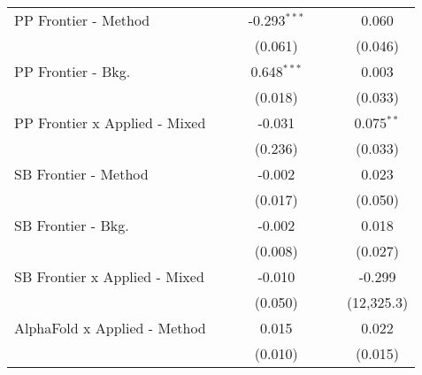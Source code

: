 \begin{tabular}{lcccccc}
   PP Frontier - Method                        &                &                & -0.293$^{***}$ &                &               & 0.060\\   
                                               &                &                & (0.061)        &                &               & (0.046)\\   
   PP Frontier - Bkg.                          &                &                & 0.648$^{***}$  &                &               & 0.003\\   
                                               &                &                & (0.018)        &                &               & (0.033)\\   
   PP Frontier x Applied - Mixed               &                &                & -0.031         &                &               & 0.075$^{**}$\\   
                                               &                &                & (0.236)        &                &               & (0.033)\\   
   SB Frontier - Method                        &                &                & -0.002         &                &               & 0.023\\   
                                               &                &                & (0.017)        &                &               & (0.050)\\   
   SB Frontier - Bkg.                          &                &                & -0.002         &                &               & 0.018\\   
                                               &                &                & (0.008)        &                &               & (0.027)\\   
   SB Frontier x Applied - Mixed               &                &                & -0.010         &                &               & -0.299\\   
                                               &                &                & (0.050)        &                &               & (12,325.3)\\   
   AlphaFold x Applied - Method                &                &                & 0.015          &                &               & 0.022\\   
                                               &                &                & (0.010)        &                &               & (0.015)\\   

\end{tabular}
